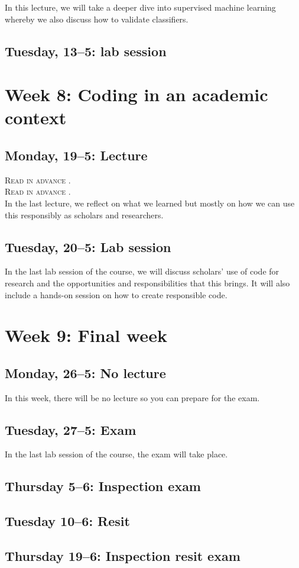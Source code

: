 In this lecture, we will take a deeper dive into supervised machine learning whereby we also discuss how to validate classifiers.

\subsection*{Tuesday, 13--5: lab session}


\section*{Week 8: Coding in an academic context}

\subsection*{Monday, 19--5: Lecture}
\textsc{ Read in advance \cite{hube_understanding_2019}.} \\
\textsc{ Read in advance \cite{bender_dangers_2021}.} \\

In the last lecture, we reflect on what we learned but mostly on how we can use this responsibly as scholars and researchers. 

\subsection*{Tuesday, 20--5: Lab session}
In the last lab session of the course, we will discuss scholars' use of code for research and the opportunities and responsibilities that this brings. It will also include a hands-on session on how to create responsible code.

\section*{Week 9: Final week}

\subsection*{Monday, 26--5: No lecture}
In this week, there will be no lecture so you can prepare for the exam.

\subsection*{Tuesday, 27--5: Exam}
In the last lab session of the course, the exam will take place. 

\subsection*{Thursday 5--6: Inspection exam}

\subsection*{Tuesday 10--6: Resit}

\subsection*{Thursday 19--6: Inspection resit exam}






